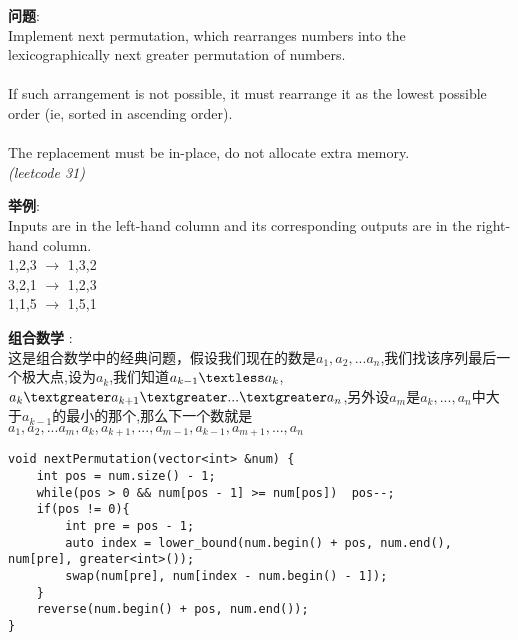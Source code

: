     
\begin{description}
    \item{\textbf{问题}}:\\
Implement next permutation, which rearranges numbers into the lexicographically next greater permutation of numbers.\\
\\
If such arrangement is not possible, it must rearrange it as the lowest possible order (ie, sorted in ascending order).\\
\\
The replacement must be in-place, do not allocate extra memory.\\
\textit{(leetcode 31)}
    \item{\textbf{举例}}:\\
Inputs are in the left-hand column and its corresponding outputs are in the right-hand column.\\
1,2,3 $\rightarrow$ 1,3,2 \\
3,2,1 $\rightarrow$ 1,2,3 \\
1,1,5 $\rightarrow$ 1,5,1
    \item{\textbf{组合数学}} : 
    \\这是组合数学中的经典问题，假设我们现在的数是$a_1,a_2,...a_n$,我们找该序列最后一个极大点,设为$a_k$,我们知道$a_{k-1} \textless a_k$, $a_k \textgreater a_{k+1} \textgreater ... \textgreater a_n$,另外设$a_m$是$a_k, ..., a_n$中大于$a_{k-1}$的最小的那个,那么下一个数就是$a_1, a_2, ... a_m, a_k, a_{k+1}, ... , a_{m-1}, a_{k-1}, a_{m+1}, ... , a_n$
    \begin{lstlisting}
void nextPermutation(vector<int> &num) {
	int pos = num.size() - 1;
	while(pos > 0 && num[pos - 1] >= num[pos])	pos--;
	if(pos != 0){
		int pre = pos - 1;
		auto index = lower_bound(num.begin() + pos, num.end(), num[pre], greater<int>());
		swap(num[pre], num[index - num.begin() - 1]);
	}
	reverse(num.begin() + pos, num.end());
}
    \end{lstlisting}
\end{description}
